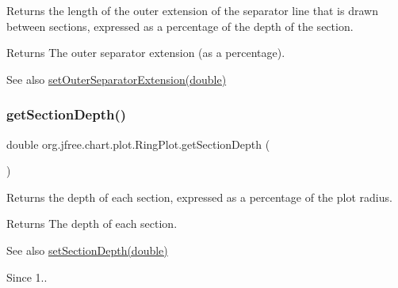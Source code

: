Returns the length of the outer extension of the separator line that is drawn between sections, expressed as a percentage of the depth of the section.

\begin{DoxyReturn}{Returns}
The outer separator extension (as a percentage).
\end{DoxyReturn}
\begin{DoxySeeAlso}{See also}
\mbox{\hyperlink{classorg_1_1jfree_1_1chart_1_1plot_1_1_ring_plot_a72407832e42e6e9d804301a68e2c269e}{set\+Outer\+Separator\+Extension(double)}} 
\end{DoxySeeAlso}
\mbox{\label{classorg_1_1jfree_1_1chart_1_1plot_1_1_ring_plot_a5046fadad2c358a4759e81a3aa8b1830}} 
\subsubsection{\texorpdfstring{get\+Section\+Depth()}{getSectionDepth()}}
{\footnotesize\ttfamily double org.\+jfree.\+chart.\+plot.\+Ring\+Plot.\+get\+Section\+Depth (\begin{DoxyParamCaption}{ }\end{DoxyParamCaption})}

Returns the depth of each section, expressed as a percentage of the plot radius.

\begin{DoxyReturn}{Returns}
The depth of each section.
\end{DoxyReturn}
\begin{DoxySeeAlso}{See also}
\mbox{\hyperlink{classorg_1_1jfree_1_1chart_1_1plot_1_1_ring_plot_a067bff0789b2865b27801dd7e22befd8}{set\+Section\+Depth(double)}} 
\end{DoxySeeAlso}
\begin{DoxySince}{Since}
1.. 
\end{DoxySince}
\mbox{\label{classorg_1_1jfree_1_1chart_1_1plot_1_1_ring_plot_af26d61ff0ae77fc675f288a3a10102b1}} 
